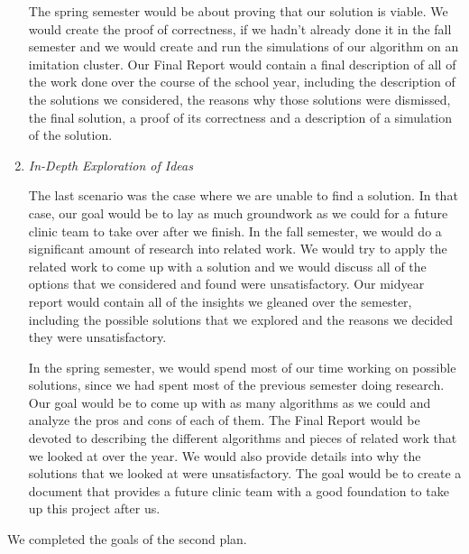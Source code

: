 \begin{enumerate}
  The spring semester would be about proving that our solution is
  viable. We would create the proof of correctness, if we hadn’t
  already done it in the fall semester and we would create and run the
  simulations of our algorithm on an imitation cluster. Our Final
  Report would contain a final description of all of the work done
  over the course of the school year, including the description of the
  solutions we considered, the reasons why those solutions were
  dismissed, the final solution, a proof of its correctness and a
  description of a simulation of the solution.


\item \emph{In-Depth Exploration of Ideas}

  The last scenario was the case where we are unable to find a
  solution. In that case, our goal would be to lay as much groundwork
  as we could for a future clinic team to take over after we
  finish. In the fall semester, we would do a significant amount of
  research into related work. We would try to apply the related work
  to come up with a solution and we would discuss all of the options
  that we considered and found were unsatisfactory. Our midyear report
  would contain all of the insights we gleaned over the semester,
  including the possible solutions that we explored and the reasons we
  decided they were unsatisfactory.

  In the spring semester, we would spend most of our time working on
  possible solutions, since we had spent most of the previous semester
  doing research. Our goal would be to come up with as many algorithms
  as we could and analyze the pros and cons of each of them. The Final
  Report would be devoted to describing the different algorithms and
  pieces of related work that we looked at over the year. We would
  also provide details into why the solutions that we looked at were
  unsatisfactory. The goal would be to create a document that provides
  a future clinic team with a good foundation to take up this project
  after us.

\end{enumerate}

We completed the goals of the second plan. 
